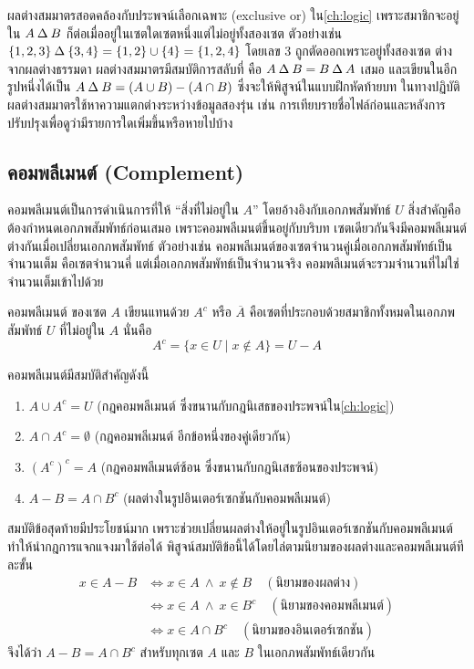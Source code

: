 ผลต่างสมมาตรสอดคล้องกับประพจน์เลือกเฉพาะ (exclusive or) ใน\autoref{ch:logic} เพราะสมาชิกจะอยู่ใน $A \mathbin{\Delta} B$ ก็ต่อเมื่ออยู่ในเซตใดเซตหนึ่งแต่ไม่อยู่ทั้งสองเซต ตัวอย่างเช่น $\{1,2,3\} \mathbin{\Delta} \{3,4\} = \{1,2\} \cup \{4\} = \{1,2,4\}$ โดยเลข 3 ถูกตัดออกเพราะอยู่ทั้งสองเซต ต่างจากผลต่างธรรมดา ผลต่างสมมาตรมีสมบัติการสลับที่ คือ $A \mathbin{\Delta} B = B \mathbin{\Delta} A$ เสมอ และเขียนในอีกรูปหนึ่งได้เป็น $A \mathbin{\Delta} B = (A \cup B) - (A \cap B)$ ซึ่งจะให้พิสูจน์ในแบบฝึกหัดท้ายบท ในทางปฏิบัติผลต่างสมมาตรใช้หาความแตกต่างระหว่างข้อมูลสองรุ่น เช่น การเทียบรายชื่อไฟล์ก่อนและหลังการปรับปรุงเพื่อดูว่ามีรายการใดเพิ่มขึ้นหรือหายไปบ้าง

\subsection{คอมพลีเมนต์ (Complement)}
คอมพลีเมนต์เป็นการดำเนินการที่ให้ ``สิ่งที่ไม่อยู่ใน $A$'' โดยอ้างอิงกับเอกภพสัมพัทธ์ $U$ สิ่งสำคัญคือต้องกำหนดเอกภพสัมพัทธ์ก่อนเสมอ เพราะคอมพลีเมนต์ขึ้นอยู่กับบริบท เซตเดียวกันจึงมีคอมพลีเมนต์ต่างกันเมื่อเปลี่ยนเอกภพสัมพัทธ์ ตัวอย่างเช่น คอมพลีเมนต์ของเซตจำนวนคู่เมื่อเอกภพสัมพัทธ์เป็นจำนวนเต็ม คือเซตจำนวนคี่ แต่เมื่อเอกภพสัมพัทธ์เป็นจำนวนจริง คอมพลีเมนต์จะรวมจำนวนที่ไม่ใช่จำนวนเต็มเข้าไปด้วย~\parencite{johnsonbaugh2016discrete}

\begin{definition}
คอมพลีเมนต์ ของเซต $A$ เขียนแทนด้วย $A^c$ หรือ $\overline{A}$ คือเซตที่ประกอบด้วยสมาชิกทั้งหมดในเอกภพสัมพัทธ์ $U$ ที่ไม่อยู่ใน $A$ นั่นคือ
\[ A^c = \{x \in U \mid x \notin A\} = U - A \]
\label{def:complement}
\end{definition}

คอมพลีเมนต์มีสมบัติสำคัญดังนี้
\begin{enumerate}
    \item $A \cup A^c = U$ (กฎคอมพลีเมนต์ ซึ่งขนานกับกฎนิเสธของประพจน์ใน\autoref{ch:logic})
    \item $A \cap A^c = \emptyset$ (กฎคอมพลีเมนต์ อีกข้อหนึ่งของคู่เดียวกัน)
    \item $(A^c)^c = A$ (กฎคอมพลีเมนต์ซ้อน ซึ่งขนานกับกฎนิเสธซ้อนของประพจน์)
    \item $A - B = A \cap B^c$ (ผลต่างในรูปอินเตอร์เซกชันกับคอมพลีเมนต์)
\end{enumerate}
สมบัติข้อสุดท้ายมีประโยชน์มาก เพราะช่วยเปลี่ยนผลต่างให้อยู่ในรูปอินเตอร์เซกชันกับคอมพลีเมนต์ ทำให้นำกฎการแจกแจงมาใช้ต่อได้ พิสูจน์สมบัติข้อนี้ได้โดยไล่ตามนิยามของผลต่างและคอมพลีเมนต์ทีละขั้น
\begin{align*}
x \in A - B
&\Leftrightarrow x \in A \ \land\ x \notin B \quad (\text{นิยามของผลต่าง})\\
&\Leftrightarrow x \in A \ \land\ x \in B^c \quad (\text{นิยามของคอมพลีเมนต์})\\
&\Leftrightarrow x \in A \cap B^c \quad (\text{นิยามของอินเตอร์เซกชัน})
\end{align*}
จึงได้ว่า $A - B = A \cap B^c$ สำหรับทุกเซต $A$ และ $B$ ในเอกภพสัมพัทธ์เดียวกัน

